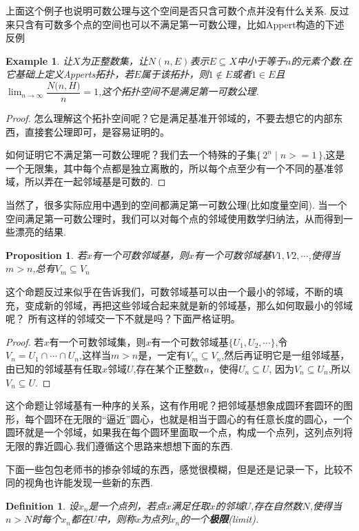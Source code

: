 \documentclass{article}
\newtheorem{proposition}[theorem]{Proposition}
\newtheorem{example}[theorem]{Example}
\newtheorem{definition}[theorem]{Definition}
\newcommand\Set[2]{\{\,#1\mid#2\,\}} %
\begin{document}
上面这个例子也说明可数公理与这个空间是否只含可数个点并没有什么关系. 反过来只含有可数多个点的空间也可以不满足第一可数公理，比如Appert构造的下述反例

\begin{example}
让$X$为正整数集，让$N(n,E)$表示$E \subseteq X$中小于等于$n$的元素个数.在它基础上定义Apperts拓扑，若$E$属于该拓扑，则$1 \notin E$或者$1 \in E$且$\displaystyle \lim_{n \mathop \to \infty} \dfrac {{N}{(n, H}) } n = 1$,这个拓扑空间不是满足第一可数公理.
\end{example}

\begin{proof}
怎么理解这个拓扑空间呢？它是满足基准开邻域的，不要去想它的内部东西，直接套公理即可，是容易证明的。

如何证明它不满足第一可数公理呢？我们去一个特殊的子集$\Set{2^n}{n>=1}$,这是一个无限集，其中每个点都是独立离散的，所以每个点至少有一个不同的基准邻域，所以弄在一起邻域基是可数的.
\end{proof}

当然了，很多实际应用中遇到的空间都满足第一可数公理(比如度量空间). 当一个空间满足第一可数公理时，我们可以对每个点的邻域使用数学归纳法，从而得到一些漂亮的结果.

\begin{proposition}
若$x$有一个可数邻域基，则$x$有一个可数邻域基${V1,V2,\cdots}$,使得当$m > n$,总有$V_m \subseteq V_n$
\end{proposition}

这个命题反过来似乎在告诉我们，可数邻域基可以由一个最小的邻域，不断的填充，变成新的邻域，再把这些邻域合起来就是新的邻域基，那么如何取最小的邻域呢？ 所有这样的邻域交一下不就是吗？下面严格证明。

\begin{proof}
若$x$有一个可数邻域集，则$x$有一个可数邻域基$\{U_1,U_2,\cdots\}$,令$V_n=U_1 \cap \cdots \cap U_n$,这样当$m>n$是，一定有$V_m \subseteq V_n$,然后再证明它是一组邻域基，由已知的邻域基有任取$x$邻域$U$,存在某个正整数$n$，使得$U_n \subseteq U$, 因为$V_n \subseteq U_n$,所以$V_n \subseteq U$.
\end{proof}

这个命题让邻域基有一种序的关系，这有作用呢？把邻域基想象成圆环套圆环的图形，每个圆环在无限的“逼近”圆心，也就是相当于圆心的有任意长度的圆心，一个圆环就是一个邻域，如果我在每个圆环里面取一个点，构成一个点列，这列点列将无限的靠近圆心.我们遵循这个思路来想想下面的东西.

下面一些包包老师书的掺杂邻域的东西，感觉很模糊，但是还是记录一下，比较不同的视角也许能发现一些新的东西.
\begin{definition}
设${x_n}$是一个点列，若点$x$满足任取$x$的邻域$U$,存在自然数$N$,使得当$n > N$时每个$x_n$都在$U$中，则称$x$为点列${x_n}$的一个\textbf{极限}(limit).
\end{definition}
\end{document}

